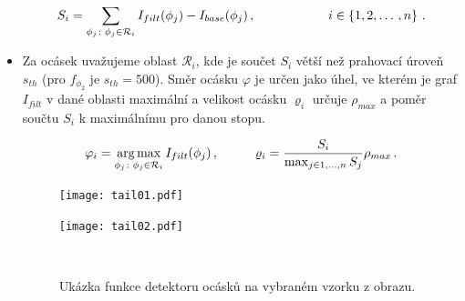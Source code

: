\begin{itemize}
	\begin{equation}
	S_i = \sum_{\phi_j \colon \phi_j \in \mathcal{R}_i}I_{filt}(\phi_j)-I_{base}(\phi_j)\,, \hspace*{2cm} i \in \left\lbrace 1, 2, \dots \,, n \right\rbrace\,.
	\label{eq:Rsuma}
	\end{equation}
	
	\item Za ocásek uvažujeme oblast $\mathcal{R}_i$, kde je součet $S_i$ větší než prahovací úroveň $s_{th}$ (pro $f_{\phi_2}$ je $s_{th} = 500$). Směr ocásku $\varphi$ je určen jako úhel, ve kterém je graf $I_{filt}$ v dané oblasti maximální a velikost ocásku $\varrho_i$ určuje $\rho_{max}$ a poměr součtu $S_i$ k maximálnímu pro danou stopu.  
	
	\begin{equation}
	\varphi_i = \operatorname*{arg\,max}_{\phi_j \colon \phi_j \in \mathcal{R}_i}I_{filt}(\phi_j) \,, \hspace{1cm} \varrho_i = \frac{S_i}{\max_{j \in 1,\dots , n}S_j}\rho_{max}\,.
	\label{eq:tail_params}
	\end{equation}
		
	\begin{figure}[htbp]
    \centering
    \begin{minipage}[c]{0.48\textwidth}
        \centering\texttt{[image: tail01.pdf]}
    \end{minipage}
    \begin{minipage}[c]{0.48\textwidth}
        \centering\texttt{[image: tail02.pdf]}
    \end{minipage}
    \\
        \caption[Detektor ocásků - příklad detekce.]{Ukázka funkce detektoru ocásků na vybraném vzorku z obrazu. }
        \label{Detekce}
\end{figure}
	
\end{itemize}	   
	
	

